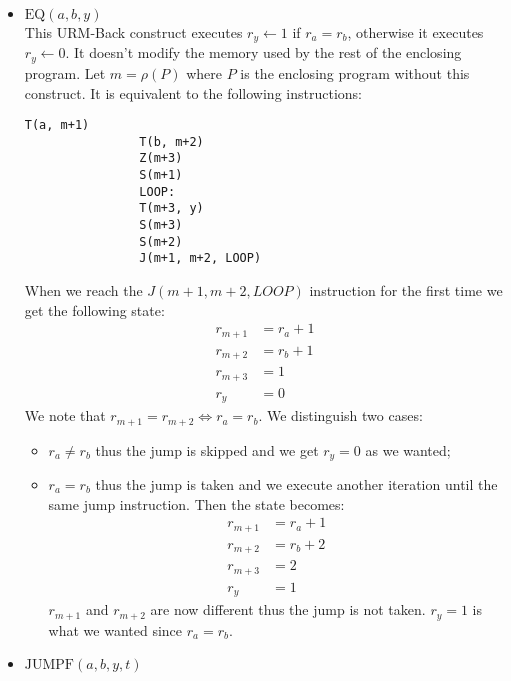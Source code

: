 \documentclass[a4paper, 12pt]{article}
\begin{document}
    \begin{itemize}
        \item $\text{EQ}(a, b, y)$ \\
            This URM-Back construct executes $r_y \leftarrow 1$ if $r_a = r_b$, otherwise it executes $r_y \leftarrow 0$. It doesn't modify the memory used by the rest of the enclosing program. Let $m = \rho (P)$ where $P$ is the enclosing program without this construct. It is equivalent to the following instructions:
            \clearpage
            \begin{lstlisting}[language=URM]
                T(a, m+1)
                T(b, m+2)
                Z(m+3)
                S(m+1)
                LOOP:
                T(m+3, y)
                S(m+3)
                S(m+2)
                J(m+1, m+2, LOOP)
            \end{lstlisting}
            When we reach the $J(m+1, m+2, LOOP)$ instruction for the first time we get the following state:
            \begin{align*}
                r_{m+1} &= r_a + 1 \\
                r_{m+2} &= r_b + 1 \\
                r_{m+3} &= 1 \\
                r_y &= 0
            \end{align*}
            We note that $r_{m+1} = r_{m+2} \iff r_a = r_b$. We distinguish two cases:
            \begin{itemize}
                \item $r_a \neq r_b$ thus the jump is skipped and we get $r_y = 0$ as we wanted;
                \item $r_a = r_b$ thus the jump is taken and we execute another iteration until the same jump instruction. Then the state becomes:
                \begin{align*}
                    r_{m+1} &= r_a + 1 \\
                    r_{m+2} &= r_b + 2 \\
                    r_{m+3} &= 2 \\
                    r_y &= 1
                \end{align*}
                $r_{m+1}$ and $r_{m+2}$ are now different thus the jump is not taken. $r_y = 1$ is what we wanted since $r_a = r_b$.
            \end{itemize}
        \item $\text{JUMPF}(a, b, y, t)$ \\

\end{itemize}
\end{document}
